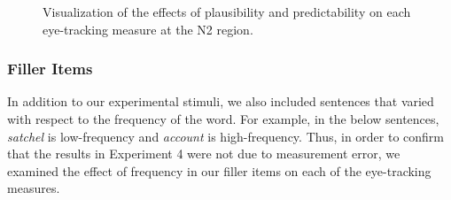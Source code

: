 \documentclass[
  12pt,
  letterpaper,
]{scrreprt}
\begin{document}
\begin{figure}[htbp]

\caption{\label{fig-fullmodelresultsn2}Visualization of the effects of
plausibility and predictability on each eye-tracking measure at the N2
region.}


\end{figure}%

\subsubsection{Filler Items}\label{filler-items}

In addition to our experimental stimuli, we also included sentences that
varied with respect to the frequency of the word. For example, in the
below sentences, \emph{satchel} is low-frequency and \emph{account} is
high-frequency. Thus, in order to confirm that the results in Experiment
4 were not due to measurement error, we examined the effect of frequency
in our filler items on each of the eye-tracking measures.
\end{document}
